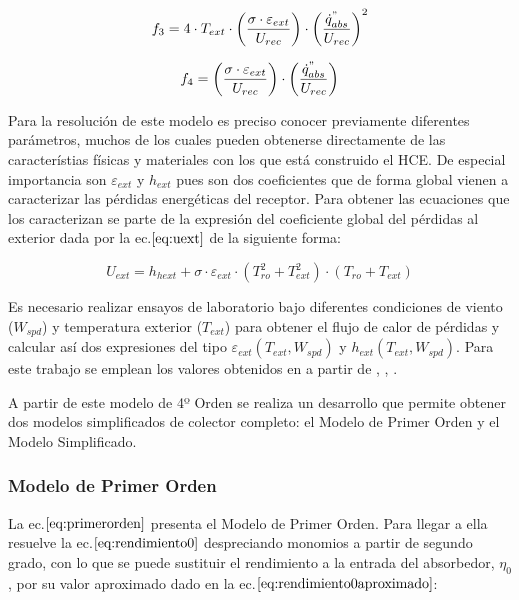 \begin{equation}
    f_{3} = 4 \cdot T_{ext} \cdot \left(\frac{\sigma \cdot \varepsilon_{ext}}{U_{rec}} \right) \cdot \left(\frac{\dot{q}^{"}_{abs}}{U_{rec}}\right)^{2} 
    \label{eq:f3}
\end{equation}

\begin{equation}
    f_{4} = \left(\frac{\sigma \cdot \varepsilon_{ext}}{U_{rec}} \right) \cdot \left(\frac{\dot{q}^{"}_{abs}}{U_{rec}}\right) 
    \label{eq:f4}
\end{equation}

Para la resolución de este modelo es preciso conocer previamente
diferentes parámetros, muchos de los cuales pueden obtenerse
directamente de las característias físicas y materiales con los que está
construido el HCE. De especial importancia son \(\varepsilon_{ext}\) y
\(h_{ext}\) pues son dos coeficientes que de forma global vienen a
caracterizar las pérdidas energéticas del receptor. Para obtener las
ecuaciones que los caracterizan se parte de la expresión del coeficiente
global del pérdidas al exterior dada por la ec.\(\eqref{eq:uext}\) de la
siguiente forma:

\begin{equation}
    U_{ext} = h_{hext} + \sigma \cdot \varepsilon_{ext} \cdot \left(T_{ro}^2 + T_{ext}^2 \right) \cdot \left(T_{ro} + T_{ext} \right)
    \label{eq:uext}
\end{equation}

Es necesario realizar ensayos de laboratorio bajo diferentes condiciones
de viento (\(W_{spd}\)) y temperatura exterior (\(T_{ext}\)) para
obtener el flujo de calor de pérdidas y calcular así dos expresiones del
tipo \(\varepsilon_{ext}(T_{ext},W_{spd})\) y
\(h_{ext}(T_{ext},W_{spd})\). Para este trabajo se emplean los valores
obtenidos en \cite{1022085/7TD8VTGL} a partir de
\cite{1022085/2CSZR6MB}, \cite{1022085/Z2N8UMZB},
\cite{1022085/8AF3BT7W} .

A partir de este modelo de 4º Orden se realiza un desarrollo que permite
obtener dos modelos simplificados de colector completo: el Modelo de
Primer Orden y el Modelo Simplificado.

\hypertarget{modelo-de-primer-orden}{%
\subsubsection{Modelo de Primer Orden}\label{modelo-de-primer-orden}}

La ec.\(\eqref{eq:primerorden}\) presenta el Modelo de Primer Orden.
Para llegar a ella resuelve la ec.\(\eqref{eq:rendimiento0}\)
despreciando monomios a partir de segundo grado, con lo que se puede
sustituir el rendimiento a la entrada del absorbedor, \(\eta_{0}\), por
su valor aproximado dado en la ec.\(\eqref{eq:rendimiento0aproximado}\):

